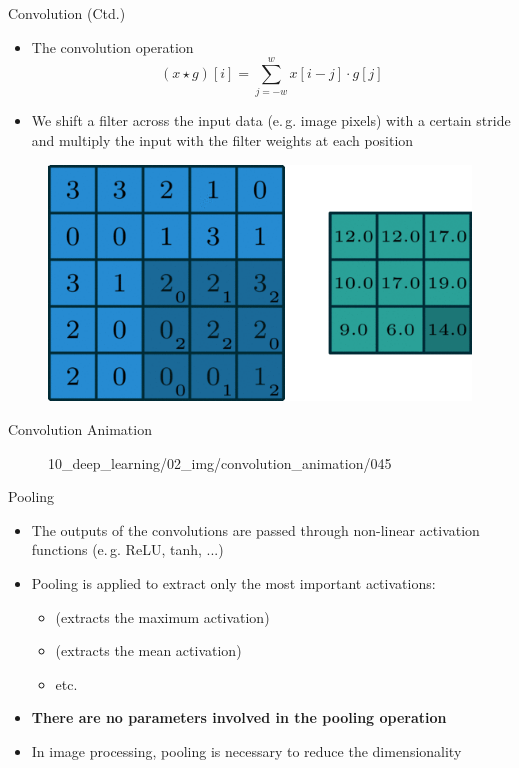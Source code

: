 \begin{frame}{Convolution (Ctd.)}{}\important
	\begin{itemize}
		\item The convolution operation
		\begin{equation*}
			(x \star g)[i] = \sum_{j=-w}^w x[i - j] \cdot g[j]
		\end{equation*}
		\item We shift a filter across the input data (e.\,g. image pixels) with a certain stride and multiply the input with the filter weights at each position
	\end{itemize}
	
	\begin{figure}
		\centering
		\includegraphics[scale=0.80]{10_deep_learning/02_img/flatconvolution}
	\end{figure}
\end{frame}


\begin{frame}{Convolution Animation}{}\important
	\begin{figure}
		\centering
			{10_deep_learning/02_img/convolution_animation/}{0}{45}
	\end{figure}
\end{frame}


\begin{frame}{Pooling}{}
	\begin{itemize}
		\item The outputs of the convolutions are passed through non-linear activation functions (e.\,g. ReLU, tanh, ...)
		\item Pooling is applied to extract only the most important activations:
		\begin{itemize}
			\item {} (extracts the maximum activation)
			\item {} (extracts the mean activation)
			\item etc.
		\end{itemize}
		\item \textbf{There are no parameters involved in the pooling operation}
		\item In image processing, pooling is necessary to reduce the dimensionality
	\end{itemize}
\end{frame}


